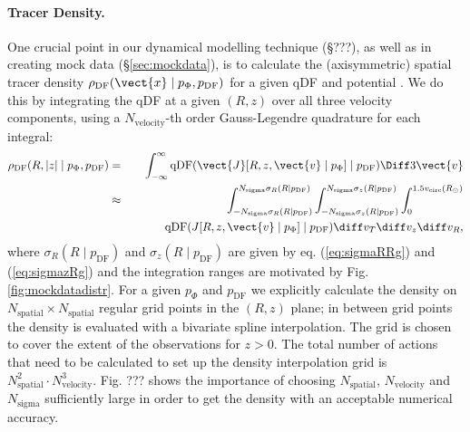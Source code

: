 \paragraph{Tracer Density.} One crucial point in our dynamical modelling technique (\S ???), as well as in creating mock data (\S\ref{sec:mockdata}), is to calculate the (axisymmetric) spatial tracer density $\rho_\text{DF}(\vect{x} \mid p_{\Phi},p_\text{DF})$ for a given qDF and potential . We do this by integrating the qDF at a given $(R,z)$ over all three velocity components, using a $N_\text{velocity}$-th order Gauss-Legendre quadrature for each integral:
\begin{eqnarray}
\rho_\text{DF}(R,|z| \mid p_{\Phi},p_\text{DF}) &=& \int_{-\infty}^{\infty} \text{qDF}(\vect{J}[R,z,\vect{v} \mid p_{\Phi}] \mid p_\text{DF}) \Diff3\vect{v}  \label{eq:tracerdensity_general}\\
&\approx& \int_{-N_\text{sigma} \sigma_R(R \mid p_\text{DF})}^{N_\text{sigma} \sigma_R(R \mid p_\text{DF})} \int_{-N_\text{sigma}\sigma_z(R \mid p_\text{DF})}^{N_\text{sigma} \sigma_z(R \mid p_\text{DF})} \int_{0}^{1.5 v_\text{circ}(R_\odot)}  \nonumber\\
& & \hspace{1cm} \text{qDF}(J[R,z,\vect{v} \mid p_{\Phi}] \mid p_\text{DF}) \diff v_T \diff v_z \diff v_R, \label{eq:tracerdensity}
\end{eqnarray}
where $\sigma_R(R \mid p_\text{DF})$ and $\sigma_z(R \mid p_\text{DF})$ are given by eq. (\ref{eq:sigmaRRg}) and (\ref{eq:sigmazRg}) and the integration ranges are motivated by Fig. \ref{fig:mockdatadistr}. For a given $p_\Phi$ and $p_\text{DF}$ we explicitly calculate the density on $N_\text{spatial} \times N_\text{spatial}$ regular grid points in the $(R,z)$ plane; in between grid points the density is evaluated with a bivariate spline interpolation. The grid is chosen to cover the extent of the observations for $z>0$. The total number of actions that need to be calculated to set up the density interpolation grid is $N_\text{spatial}^2 \cdot N_\text{velocity}^3$. Fig. ??? shows the importance of choosing $N_\text{spatial}$, $N_\text{velocity}$ and $N_\text{sigma}$ sufficiently large in order to get the density with an acceptable numerical accuracy. 


